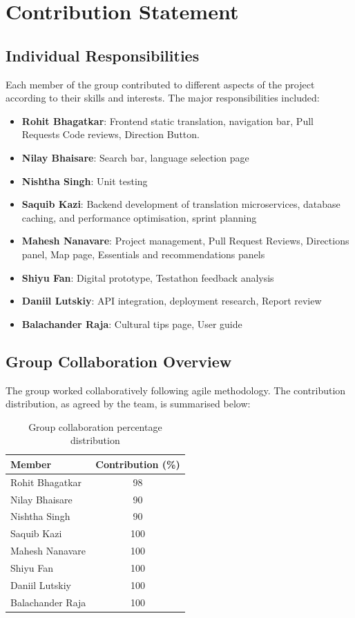 \chapter{Contribution Statement}

\section{Individual Responsibilities}
Each member of the group contributed to different aspects of the project according to their skills and interests. The major responsibilities included:  
\begin{itemize}\setlength\itemsep{0em}\setlength\parskip{0em}
    \item \textbf{Rohit Bhagatkar}: Frontend static translation, navigation bar, Pull Requests Code reviews, Direction Button.
    \item \textbf{Nilay Bhaisare}: Search bar, language selection page
    \item \textbf{Nishtha Singh}: Unit testing  
    \item \textbf{Saquib Kazi}: Backend development of translation microservices, database caching, and performance optimisation, sprint planning
    \item \textbf{Mahesh Nanavare}: Project management, Pull Request Reviews, Directions panel, Map page, Essentials and recommendations panels
    \item \textbf{Shiyu Fan}: Digital prototype, Testathon feedback analysis
    \item \textbf{Daniil Lutskiy}: API integration, deployment research, Report review
    \item \textbf{Balachander Raja}: Cultural tips page, User guide  
\end{itemize}

\section{Group Collaboration Overview}
The group worked collaboratively following agile methodology. The contribution distribution, as agreed by the team, is summarised below:

\begin{table}[H]
\centering
\renewcommand{\arraystretch}{0.9} %
\begin{tabular}{|l|c|}
\hline
\textbf{Member} & \textbf{Contribution (\%)} \\
\hline
Rohit Bhagatkar   & 98  \\
Nilay Bhaisare    & 90  \\
Nishtha Singh     & 90  \\
Saquib Kazi       & 100 \\
Mahesh Nanavare   & 100 \\
Shiyu Fan         & 100 \\
Daniil Lutskiy    & 100 \\
Balachander Raja  & 100 \\
\hline
\end{tabular}
\caption{Group collaboration percentage distribution}
\end{table}